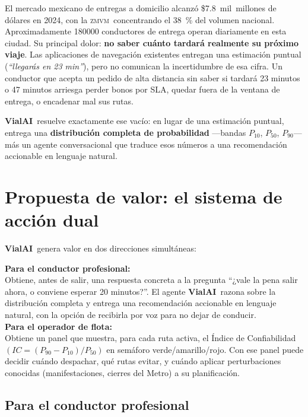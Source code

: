 \documentclass[11pt,a4paper]{article}
\newcommand{\VialAI}{\textbf{\textcolor{vialTeal}{Vial}\textcolor{vialAmber}{AI}}}
\newcommand{\ZMVM}{\textsc{zmvm}}
\begin{document}
El mercado mexicano de entregas a domicilio alcanzó
\$\num{7.8}~mil~millones de dólares en 2024, con la \ZMVM\ concentrando
el \SI{38}{\percent} del volumen nacional. Aproximadamente
\num{180000} conductores de entrega operan diariamente en esta ciudad.
Su principal dolor: \textbf{no saber cuánto tardará realmente su
próximo viaje}. Las aplicaciones de navegación existentes entregan una
estimación puntual (\emph{``llegarás en 23 min''}), pero no comunican
la incertidumbre de esa cifra. Un conductor que acepta un pedido de
alta distancia sin saber si tardará 23 minutos o 47 minutos arriesga
perder bonos por SLA, quedar fuera de la ventana de entrega, o
encadenar mal sus rutas.

\VialAI\ resuelve exactamente ese vacío: en lugar de una estimación
puntual, entrega una \textbf{distribución completa de probabilidad}
---bandas $P_{10}$, $P_{50}$, $P_{90}$--- más un agente conversacional
que traduce esos números a una recomendación accionable en lenguaje
natural.

\section{Propuesta de valor: el sistema de acción dual}

\VialAI\ genera valor en dos direcciones simultáneas:

\begin{keybox}
\textbf{Para el conductor profesional:}\\
Obtiene, antes de salir, una respuesta concreta a la pregunta
``¿vale la pena salir ahora, o conviene esperar 20 minutos?''.
El agente \VialAI\ razona sobre la distribución completa y entrega una
recomendación accionable en lenguaje natural, con la opción de
recibirla por voz para no dejar de conducir.\\[0.5em]
\textbf{Para el operador de flota:}\\
Obtiene un panel que muestra, para cada ruta activa, el Índice de
Confiabilidad $(IC = (P_{90} - P_{10}) / P_{50})$ en semáforo
verde/amarillo/rojo. Con ese panel puede decidir cuándo despachar,
qué rutas evitar, y cuándo aplicar perturbaciones conocidas
(manifestaciones, cierres del Metro) a su planificación.
\end{keybox}

\subsection{Para el conductor profesional}
\end{document}
